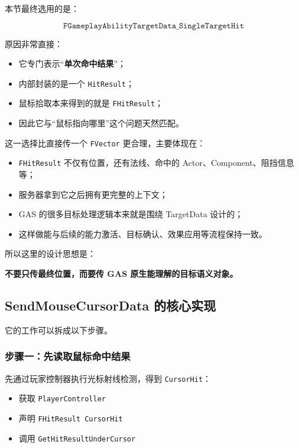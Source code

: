 \documentclass[10pt,CJKmath]{ctexart}
\begin{document}
本节最终选用的是：

\[
\texttt{FGameplayAbilityTargetData\_SingleTargetHit}
\]

原因非常直接：

\begin{itemize}
	\item 它专门表示“\textbf{单次命中结果}”；
	\item 内部封装的是一个 \texttt{HitResult}；
	\item 鼠标拾取本来得到的就是 \texttt{FHitResult}；
	\item 因此它与“鼠标指向哪里”这个问题天然匹配。
\end{itemize}

这一选择比直接传一个 \texttt{FVector} 更合理，主要体现在：

\begin{itemize}
	\item \texttt{FHitResult} 不仅有位置，还有法线、命中的 Actor、Component、阻挡信息等；
	\item 服务器拿到它之后拥有更完整的上下文；
	\item GAS 的很多目标处理逻辑本来就是围绕 TargetData 设计的；
	\item 这样做能与后续的能力激活、目标确认、效果应用等流程保持一致。
\end{itemize}

所以这里的设计思想是：

\begin{center}
	\textbf{不要只传最终位置，而要传 GAS 原生能理解的目标语义对象。}
\end{center}

\subsection{SendMouseCursorData 的核心实现}



它的工作可以拆成以下步骤。

\subsubsection{步骤一：先读取鼠标命中结果}

先通过玩家控制器执行光标射线检测，得到 \texttt{CursorHit}：

\begin{itemize}
	\item 获取 \texttt{PlayerController}
	\item 声明 \texttt{FHitResult CursorHit}
	\item 调用 \texttt{GetHitResultUnderCursor}
\end{itemize}
\end{document}
